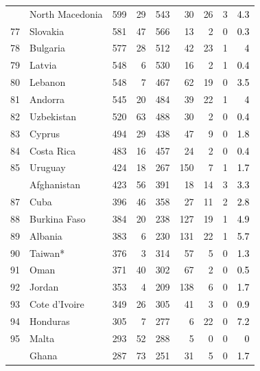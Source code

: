 \documentclass[12pt, a4paper,oneside]{book}
\theoremstyle{definition}
\begin{document}
\begin{longtable}{llrrrrrrr}
	\addlinespace
	76 & North Macedonia & 599 & 29 & 543 & 30 & 26 & 3 & \textcolor{black}{4.3}\\
	\rowcolor{gray!6}  77 & Slovakia & 581 & 47 & 566 & 13 & 2 & 0 & \textcolor{black}{0.3}\\
	78 & Bulgaria & 577 & 28 & 512 & 42 & 23 & 1 & \textcolor{black}{4}\\
	\rowcolor{gray!6}  79 & Latvia & 548 & 6 & 530 & 16 & 2 & 1 & \textcolor{black}{0.4}\\
	80 & Lebanon & 548 & 7 & 467 & 62 & 19 & 0 & \textcolor{black}{3.5}\\
	\addlinespace
	\rowcolor{gray!6}  81 & Andorra & 545 & 20 & 484 & 39 & 22 & 1 & \textcolor{black}{4}\\
	82 & Uzbekistan & 520 & 63 & 488 & 30 & 2 & 0 & \textcolor{black}{0.4}\\
	\rowcolor{gray!6}  83 & Cyprus & 494 & 29 & 438 & 47 & 9 & 0 & \textcolor{black}{1.8}\\
	84 & Costa Rica & 483 & 16 & 457 & 24 & 2 & 0 & \textcolor{black}{0.4}\\
	\rowcolor{gray!6}  85 & Uruguay & 424 & 18 & 267 & 150 & 7 & 1 & \textcolor{black}{1.7}\\
	\addlinespace
	86 & Afghanistan & 423 & 56 & 391 & 18 & 14 & 3 & \textcolor{black}{3.3}\\
	\rowcolor{gray!6}  87 & Cuba & 396 & 46 & 358 & 27 & 11 & 2 & \textcolor{black}{2.8}\\
	88 & Burkina Faso & 384 & 20 & 238 & 127 & 19 & 1 & \textcolor{black}{4.9}\\
	\rowcolor{gray!6}  89 & Albania & 383 & 6 & 230 & 131 & 22 & 1 & \textcolor{black}{5.7}\\
	90 & Taiwan* & 376 & 3 & 314 & 57 & 5 & 0 & \textcolor{black}{1.3}\\
	\addlinespace
	\rowcolor{gray!6}  91 & Oman & 371 & 40 & 302 & 67 & 2 & 0 & \textcolor{black}{0.5}\\
	92 & Jordan & 353 & 4 & 209 & 138 & 6 & 0 & \textcolor{black}{1.7}\\
	\rowcolor{gray!6}  93 & Cote d'Ivoire & 349 & 26 & 305 & 41 & 3 & 0 & \textcolor{black}{0.9}\\
	94 & Honduras & 305 & 7 & 277 & 6 & 22 & 0 & \textcolor{black}{7.2}\\
	\rowcolor{gray!6}  95 & Malta & 293 & 52 & 288 & 5 & 0 & 0 & \textcolor{black}{0}\\
	\addlinespace
	96 & Ghana & 287 & 73 & 251 & 31 & 5 & 0 & \textcolor{black}{1.7}\\

\end{longtable}
\end{document}
